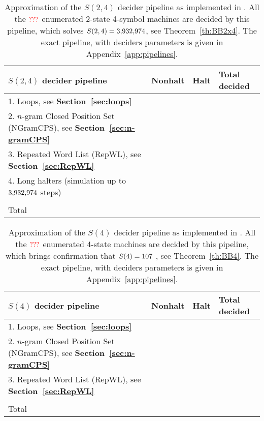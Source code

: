\begin{table}[h!]

    \begin{tabular}{llll}
        $S(2,4)$ decider pipeline                                                            & Nonhalt & Halt & Total decided \\
        \hline
        1. Loops, see \textbf{Section~\ref{sec:loops}}                                       &         &      &               \\
        2. $n$-gram Closed Position Set (NGramCPS), see \textbf{Section~\ref{sec:n-gramCPS}} &         &      &               \\
        3. Repeated Word List (RepWL), see \textbf{Section~\ref{sec:RepWL}}                  &         &      &               \\
        4. Long halters (simulation up to $3{,}932{,}974$ steps)                                    &         &      &               \\
        \\ \hline
        Total                                                                                &         &      &
    \end{tabular}
    \caption{Approximation of the $S(2,4)$ decider pipeline as implemented in \CoqBB. All the ${\color{red}???}$ enumerated 2-state 4-symbol machines are decided by this pipeline, which solves $S(2,4) = 3{,}932{,}974$, see Theorem~\ref{th:BB2x4}. The exact pipeline, with deciders parameters is given in Appendix~\ref{app:pipelines}. }\label{tab:pipelineBB2x4}
\end{table}

\begin{table}[h!]

    \begin{tabular}{llll}
        $S(4)$ decider pipeline                                                              & Nonhalt & Halt & Total decided \\
        \hline
        1. Loops, see \textbf{Section~\ref{sec:loops}}                                       &         &      &               \\
        2. $n$-gram Closed Position Set (NGramCPS), see \textbf{Section~\ref{sec:n-gramCPS}} &         &      &               \\
        3. Repeated Word List (RepWL), see \textbf{Section~\ref{sec:RepWL}}                  &         &      &               \\
        \\ \hline
        Total                                                                                &         &      &
    \end{tabular}
    \caption{Approximation of the $S(4)$ decider pipeline as implemented in \CoqBB. All the ${\color{red}???}$ enumerated 4-state machines are decided by this pipeline, which brings confirmation that $S(4) = 107$ \cite{Brady83}, see Theorem~\ref{th:BB4}. The exact pipeline, with deciders parameters is given in Appendix~\ref{app:pipelines}. }\label{tab:pipelineBB4}
\end{table}